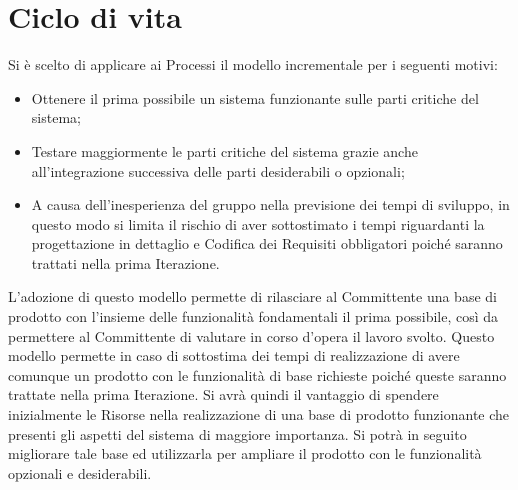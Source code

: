 \section{Ciclo di vita}{
	Si è scelto di applicare ai Processi il modello incrementale per i seguenti motivi:
	\begin{itemize}
		\item Ottenere il prima possibile un sistema funzionante sulle parti critiche del sistema;
		\item Testare maggiormente le parti critiche del sistema grazie anche all'integrazione successiva delle parti desiderabili o opzionali;
		\item A causa dell'inesperienza del gruppo nella previsione dei tempi di sviluppo, in questo modo si limita il rischio di aver sottostimato i tempi riguardanti la progettazione in dettaglio e Codifica dei Requisiti obbligatori poiché saranno trattati nella prima Iterazione.
	\end{itemize}
	L'adozione di questo modello permette di rilasciare al Committente una base di prodotto con l'insieme delle funzionalità fondamentali il prima possibile, così da permettere al Committente di valutare in corso d'opera il lavoro svolto. 
	Questo modello permette in caso di sottostima dei tempi di realizzazione di avere comunque un prodotto con le funzionalità di base richieste poiché queste saranno trattate nella prima Iterazione.
	Si avrà quindi il vantaggio di spendere inizialmente le Risorse nella realizzazione di una base di prodotto funzionante che presenti gli aspetti del sistema di maggiore importanza. 
	Si potrà in seguito migliorare tale base ed utilizzarla per ampliare il prodotto con le funzionalità opzionali e desiderabili.
}


